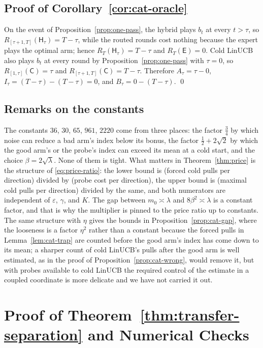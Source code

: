 \documentclass{article}
\theoremstyle{definition}
\theoremstyle{remark}
\newcommand{\eps}{\varepsilon}
\theoremstyle{remark}
\newcommand{\Cold}{\mathsf{C}}
\newcommand{\Exp}{\mathsf{E}}
\newcommand{\Hyb}{\mathsf{H}}
\begin{document}
\subsection{Proof of Corollary~\ref{cor:cat-oracle}}

On the event of Proposition~\ref{prop:one-pass}, the hybrid plays $b_t$ at
every $t>\tau$, so $R_{[\tau+1,T]}(\Hyb_\tau)=T-\tau$, while the routed rounds
cost nothing because the expert plays the optimal arm; hence
$R_T(\Hyb_\tau)=T-\tau$ and $R_T(\Exp)=0$. Cold LinUCB also plays $b_t$ at
every round by Proposition~\ref{prop:one-pass} with $\tau=0$, so
$R_{[1,\tau]}(\Cold)=\tau$ and $R_{[\tau+1,T]}(\Cold)=T-\tau$. Therefore
$A_\tau=\tau-0$, $I_\tau=(T-\tau)-(T-\tau)=0$, and $B_\tau=0-(T-\tau)$. \qed

\subsection{Remarks on the constants}

The constants $36$, $30$, $65$, $961$, $2220$ come from three places: the
factor $\tfrac34$ by which noise can reduce a bad arm's index below its bonus,
the factor $\tfrac12+2\sqrt2$ by which the good arm's or the probe's index can
exceed its mean at a cold start, and the choice $\beta=2\sqrt\lambda$. None of
them is tight. What matters in Theorem~\ref{thm:price} is the structure of
\eqref{eq:price-ratio}: the lower bound is (forced cold pulls per direction)
divided by (probe cost per direction), the upper bound is (maximal cold pulls
per direction) divided by the same, and both numerators are independent of
$\eps$, $\gamma$, and $K$. The gap between $m_0\asymp\lambda$ and $8\beta^2\asymp\lambda$
is a constant factor, and that is why the multiplier is pinned to the price
ratio up to constants. The same structure with $\eta$ gives the bounds in
Proposition~\ref{prop:cat-gap}, where the looseness is a factor $\eta^2$ rather
than a constant because the forced pulls in Lemma~\ref{lem:cat-trap} are
counted before the good arm's index has come down to its mean; a sharper
count of cold LinUCB's pulls after the good arm is well estimated, as in the
proof of Proposition~\ref{prop:cat-wrong}, would remove it, but with probes
available to cold LinUCB the required control of the estimate in a coupled
coordinate is more delicate and we have not carried it out.


\section{Proof of Theorem~\ref{thm:transfer-separation} and Numerical Checks}
\label{app:proof-transfer-sep}
\end{document}

